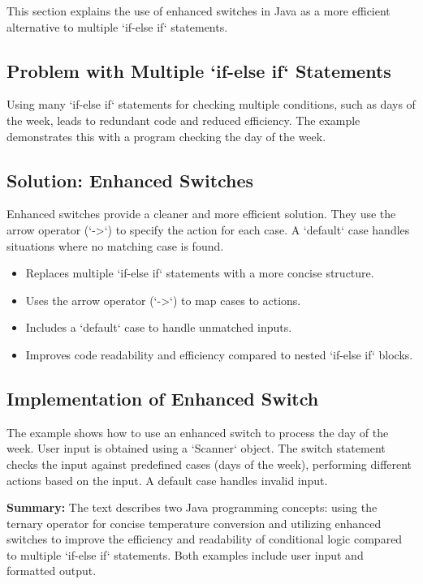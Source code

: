 \documentclass{article}
\begin{document}
This section explains the use of enhanced switches in Java as a more efficient alternative to multiple `if-else if` statements.

\subsection{Problem with Multiple `if-else if` Statements}

Using many `if-else if` statements for checking multiple conditions, such as days of the week, leads to redundant code and reduced efficiency.  The example demonstrates this with a program checking the day of the week.

\subsection{Solution: Enhanced Switches}

Enhanced switches provide a cleaner and more efficient solution.  They use the arrow operator (`->`) to specify the action for each case.  A `default` case handles situations where no matching case is found.


\begin{itemize}
    \item Replaces multiple `if-else if` statements with a more concise structure.
    \item Uses the arrow operator (`->`) to map cases to actions.
    \item Includes a `default` case to handle unmatched inputs.
    \item Improves code readability and efficiency compared to nested `if-else if` blocks.
\end{itemize}


\subsection{Implementation of Enhanced Switch}

The example shows how to use an enhanced switch to process the day of the week.  User input is obtained using a `Scanner` object.  The switch statement checks the input against predefined cases (days of the week), performing different actions based on the input. A default case handles invalid input.


\textbf{Summary:} The text describes two Java programming concepts: using the ternary operator for concise temperature conversion and utilizing enhanced switches to improve the efficiency and readability of conditional logic compared to multiple `if-else if` statements. Both examples include user input and formatted output.
\end{document}
